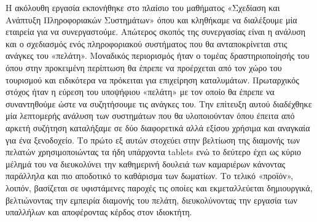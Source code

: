 Η ακόλουθη εργασία εκπονήθηκε στο πλαίσιο του μαθήματος «Σχεδίαση και 
Ανάπτυξη Πληροφοριακών Συστημάτων» όπου και κληθήκαμε να διαλέξουμε 
μία εταιρεία για να συνεργαστούμε. Απώτερος σκοπός της συνεργασίας είναι η
 ανάλυση και ο σχεδιασμός ενός πληροφοριακού συστήματος που θα 
 ανταποκρίνεται στις ανάγκες του «πελάτη». Μοναδικός περιορισμός ήταν ο 
 τομέας δραστηριοποίησής του όπου στην προκειμένη περίπτωση θα έπρεπε 
 να προέρχεται από τον χώρο του τουρισμού και ειδικότερα να πρόκειται για 
 επιχείρηση καταλυμάτων. Πρωταρχικός στόχος ήταν η εύρεση του υποψήφιου 
 «πελάτη» με τον οποίο θα έπρεπε να συναντηθούμε ώστε να συζητήσουμε τις 
 ανάγκες του. Την επίτευξη αυτού διαδέχθηκε μία λεπτομερής ανάλυση των 
 συστημάτων που θα υλοποιούνταν όπου έπειτα από αρκετή συζήτηση 
 καταλήξαμε σε δύο διαφορετικά αλλά εξίσου χρήσιμα και αναγκαία για ένα 
 ξενοδοχείο. Το πρώτο εξ αυτών στοχεύει στην βελτίωση της διαμονής των 
 πελατών χρησιμοποιώντας τα ήδη υπάρχοντα tablets ενώ το δεύτερο έχει ως 
 κύριο μέλημά του να διευκολύνει την καθημερινή δουλειά των καμαριέρων 
 κάνοντας παράλληλα και πιο αποδοτικό το καθάρισμα των δωματίων.
Το τελικό «προϊόν», λοιπόν, βασίζεται σε υφιστάμενες παροχές τις οποίες και 
εκμεταλλεύεται δημιουργικά, βελτιώνοντας την εμπειρία διαμονής του πελάτη, 
διευκολύνοντας την εργασία των υπαλλήλων και αποφέροντας κέρδος στον
ιδιοκτήτη. 
